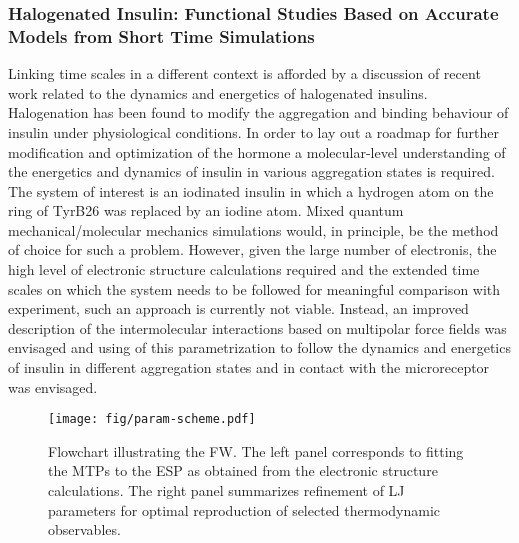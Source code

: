 \documentclass[journal=jacsat,manuscript=article]{achemso}
\begin{document}
\subsubsection{Halogenated Insulin: Functional Studies Based on Accurate Models from Short Time Simulations}
Linking time scales in a different context is afforded by a discussion
of recent work related to the dynamics and energetics of halogenated
insulins. Halogenation has been found to modify the aggregation and
binding behaviour of insulin under physiological conditions. In order
to lay out a roadmap for further modification and optimization of the
hormone a molecular-level understanding of the energetics and dynamics
of insulin in various aggregation states is required. The system of
interest is an iodinated insulin in which a hydrogen atom on the ring
of TyrB26 was replaced by an iodine atom. Mixed quantum
mechanical/molecular mechanics simulations would, in principle, be the
method of choice for such a problem. However, given the large number
of electronis, the high level of electronic structure calculations
required and the extended time scales on which the system needs to be
followed for meaningful comparison with experiment, such an approach
is currently not viable. Instead, an improved description of the
intermolecular interactions based on multipolar force fields was
envisaged and using of this parametrization to follow the dynamics and
energetics of insulin in different aggregation states and in contact
with the microreceptor was envisaged.\\

\begin{figure}[h]
\centering
\texttt{[image: fig/param-scheme.pdf]}
\caption{Flowchart illustrating the FW. The left panel corresponds to
  fitting the MTPs to the ESP as obtained from the electronic
  structure calculations. The right panel summarizes refinement of LJ
  parameters for optimal reproduction of selected thermodynamic
  observables.}
\label{fig:param}
\end{figure}
\end{document}
